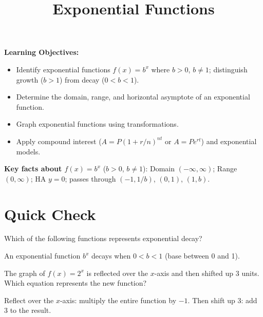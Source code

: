 \documentclass{ximera}
\title{Exponential Functions}
\begin{document}
\begin{abstract}
\end{abstract}
\maketitle

\textbf{Learning Objectives:}
\begin{itemize}
  \item Identify exponential functions $f(x)=b^x$ where $b>0$, $b\neq1$; distinguish growth ($b>1$) from decay ($0<b<1$).
  \item Determine the domain, range, and horizontal asymptote of an exponential function.
  \item Graph exponential functions using transformations.
  \item Apply compound interest ($A=P(1+r/n)^{nt}$ or $A=Pe^{rt}$) and exponential models.
\end{itemize}
\medskip

\noindent\textbf{Key facts about $f(x)=b^x$} ($b>0$, $b\neq1$): Domain $(-\infty,\infty)$; Range $(0,\infty)$; HA $y=0$; passes through $(-1,1/b)$, $(0,1)$, $(1,b)$.

\bigskip
\section*{Quick Check}

\begin{problem}
Which of the following functions represents exponential decay?
\begin{hint}
An exponential function $b^x$ decays when $0 < b < 1$ (base between 0 and 1).
\end{hint}
\begin{multipleChoice}
\end{multipleChoice}
\end{problem}

\begin{problem}
The graph of $f(x) = 2^x$ is reflected over the $x$-axis and then shifted up 3 units. Which equation represents the new function?
\begin{hint}
Reflect over the $x$-axis: multiply the entire function by $-1$. Then shift up 3: add 3 to the result.
\end{hint}
\begin{multipleChoice}
\end{multipleChoice}
\end{problem}
\end{document}
